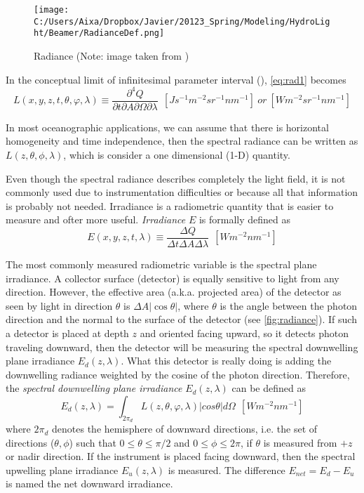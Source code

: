 \begin{figure}[htb]
  \centering
  \texttt{[image: C:/Users/Aixa/Dropbox/Javier/20123\_Spring/Modeling/HydroLight/Beamer/RadianceDef.png]}
\caption{Radiance (Note: image taken from \cite{Mobley:2001})}
\label{fig:radiance} 
\end{figure}

In the conceptual limit of infinitesimal parameter interval (\cite{Mobley:2001}), \autoref{eq:rad1} becomes
\begin{equation}
  L(x,y,z,t,\theta,\varphi,\lambda)\equiv\frac{\partial^4 Q}{\partial t\partial A\partial\Omega\partial\lambda}~~\left[ Js^{-1}m^{-2}sr^{-1}nm^{-1} \right]~or~\left[ W m^{-2}sr^{-1}nm^{-1} \right]
\end{equation}

In most oceanographic applications, we can assume that there is horizontal homogeneity and time independence, then the spectral radiance can be written as $L(z,\theta,\phi,\lambda)$, which is consider a one dimensional (1-D) quantity.

Even though the spectral radiance describes completely the light field, it is not commonly used due to instrumentation difficulties or because all that information is probably not needed. Irradiance is a radiometric quantity that is easier to measure and ofter more useful. {\it Irradiance} $E$ is formally defined as
\begin{equation}
  E(x,y,z,t,\lambda) \equiv \frac{\Delta Q}{\Delta t\Delta A\Delta\lambda}~~\left[ W m^{-2}nm^{-1} \right]
\end{equation}

The most commonly measured radiometric variable is the spectral plane irradiance. A collector surface (detector) is equally sensitive to light from any direction. However, the effective area (a.k.a. projected area) of the detector as seen by light in direction $\theta$ is $\Delta A|\cos{\theta}|$, where $\theta$ is the angle between the photon direction and the normal to the surface of the detector (see \autoref{fig:radiance}). If such a detector is placed at depth $z$ and oriented facing upward, so it detects photon traveling downward, then the detector will be measuring the spectral downwelling plane irradiance $E_d(z,\lambda)$. What this detector is really doing is adding the downwelling radiance weighted by the cosine of the photon direction. Therefore, the {\it spectral downwelling plane irradiance} $E_d(z,\lambda)$ can be defined as
\begin{equation}
  E_{d}(z,\lambda)=\int_{2\pi_d} L(z,\theta,\varphi,\lambda)|cos\theta|d\Omega~~\left[Wm^{-2}nm^{-1} \right]
\end{equation}
where $2\pi_d$ denotes the hemisphere of downward directions, i.e. the set of directions ($\theta,\phi$) such that $0\leq\theta\leq\pi/2$ and $0\leq\phi\leq2\pi$, if $\theta$ is measured from $+z$ or nadir direction. If the instrument is placed facing downward, then the spectral upwelling plane irradiance $E_u(z,\lambda)$ is measured. The difference $E_{net}=E_d-E_u$ is named the net downward irradiance.

